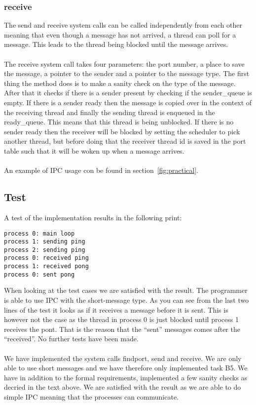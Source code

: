 \subsubsection*{receive}
The send and receive system calls can be called independently from each other meaning that even though a message has not arrived, a thread can poll for a message. This leads to the thread being blocked until the message arrives.\\
\\
The receive system call takes four parameters: the port number, a place to save the message, a pointer to the sender and a pointer to the message type.
The first thing the method does is to make a sanity check on the type of the message.\\
After that it checks if there is a sender present by checking if the sender\_queue is empty. If there is a sender ready then the message is copied over in the context of the receiving thread and finally the sending thread is enqueued in the ready\_queue. This means that this thread is being unblocked.
If there is no sender ready then the receiver will be blocked by setting the scheduler to pick another thread, but before doing that the receiver thread id is saved in the port table such that it will be woken up when a message arrives.\\
\\
An example of IPC usage con be found in section~\ref{fig:practical}.


\subsection{Test}
A test of the implementation results in the following print:
\begin{verbatim}
process 0: main loop
process 1: sending ping
process 2: sending ping
process 0: received ping
process 1: received pong
process 0: sent pong
\end{verbatim}
When looking at the test cases we are satisfied with the result. The programmer is able to use IPC with the short-message type. As you can see from the last two lines of the test it looks as if it receives a message before it is sent. This is however not the case as the thread in process 0 is just blocked until process 1 receives the pont. That is the reason that the “sent” messages comes after the “received”.
No further tests have been made.\\
\\
We have implemented the system calls findport, send and receive. We are only able to use short messages and we have therefore only implemented task B5. We have in addition to the formal requirements, implemented a few sanity checks as decried in the text above. We are satisfied with the result as we are able to do simple IPC meaning that the processes can communicate.